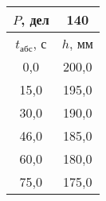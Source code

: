 \begin{tabular}[t]{|c|c|}
\hline
$P$, дел & 140 \\
\hline
$t_{абс}$, с & $h$, мм \\ 
\hline
0,0 & 200,0 \\ 
15,0 & 195,0 \\ 
30,0 & 190,0 \\ 
46,0 & 185,0 \\ 
60,0 & 180,0 \\ 
75,0 & 175,0 \\ 
\hline
\end{tabular}